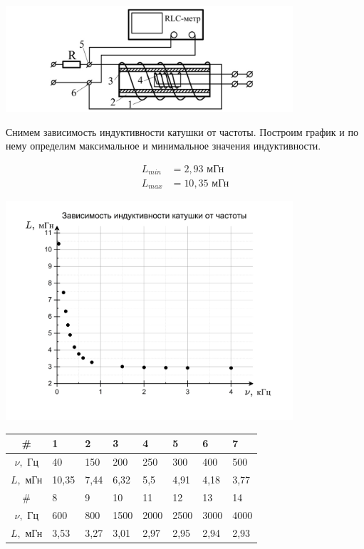 \documentclass[a4paper,12pt]{article}
\theoremstyle{plain} %
\theoremstyle{definition} %
\theoremstyle{remark} %
\begin{document}
								\includegraphics[width = 0.8\textwidth]{rlc}
								
		Снимем зависимость индуктивности катушки от частоты. Построим график и по нему определим максимальное и минимальное значения индуктивности.
		
		\begin{align}
			L_{min} &= 2,93 \text{ мГн} \\
			L_{max} &= 10,35  \text{ мГн}
		\end{align}
		
						\includegraphics[width = 0.8\textwidth]{lv}
						
									\begin{table}[h]
		\begin{tabularx}{\textwidth}{|c|Y|Y|Y|Y|Y|Y|Y|}
			\hline
		\# & 1 & 2 & 3 & 4 & 5 & 6 & 7\\ \hline
		$\nu,$ Гц & 40 & 150 & 200 & 250 & 300 & 400 & 500 \\ \hline
		$L,$ мГн & 10,35 & 7,44 & 6,32 & 5,5 &4,91 & 4,18 & 3,77 \\ \hline
		\# & 8 & 9 & 10 & 11 & 12 & 13 & 14 \\ \hline
		$\nu,$ Гц  & 600 & 800  & 1500 & 2000 & 2500 & 3000 & 4000 \\ \hline
		$L,$ мГн & 3,53 & 3,27 & 3,01& 2,97 & 2,95 & 2,94 & 2,93 \\ \hline
		\end{tabularx}
		\label{tab:my-table4}
	\end{table}					
						
\end{document}

